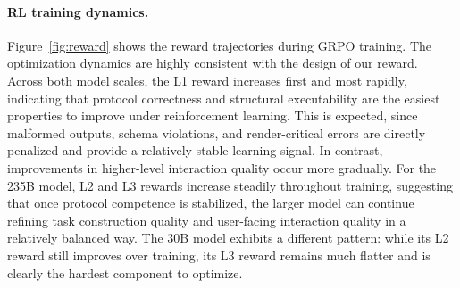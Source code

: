 \paragraph{RL training dynamics.}
Figure~\ref{fig:reward} shows the reward trajectories during GRPO training. The optimization dynamics are highly consistent with the design of our reward. Across both model scales, the L1 reward increases first and most rapidly, indicating that protocol correctness and structural executability are the easiest properties to improve under reinforcement learning. This is expected, since malformed outputs, schema violations, and render-critical errors are directly penalized and provide a relatively stable learning signal. In contrast, improvements in higher-level interaction quality occur more gradually. For the 235B model, L2 and L3 rewards increase steadily throughout training, suggesting that once protocol competence is stabilized, the larger model can continue refining task construction quality and user-facing interaction quality in a relatively balanced way. The 30B model exhibits a different pattern: while its L2 reward still improves over training, its L3 reward remains much flatter and is clearly the hardest component to optimize.
